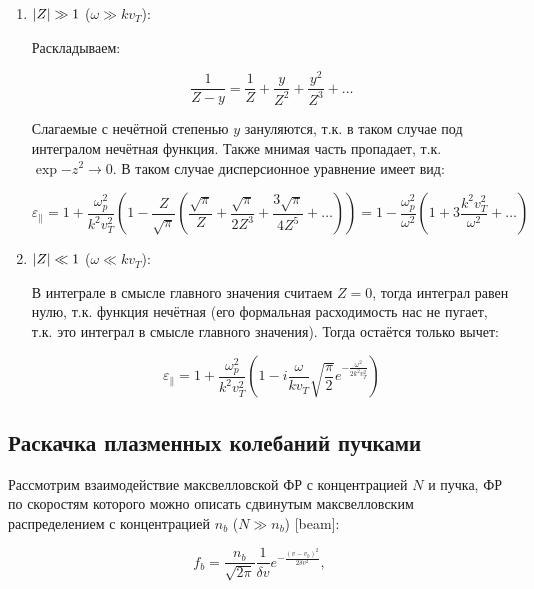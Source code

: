 \documentclass[10pt, a4paper]{article}
\begin{document}
\begin{enumerate}
	
	\item $\abs{Z} \gg 1$ ($\omega \gg kv_T$):
	
	Раскладываем:
	
	\begin{equation*}
		\frac{1}{Z-y} = \frac{1}{Z} + \frac{y}{Z^2} + \frac{y^2}{Z^3} + \ldots
	\end{equation*}
	
	Слагаемые с нечётной степенью $y$ зануляются, т.к. в таком случае под интегралом нечётная функция. Также мнимая часть пропадает, т.к. $\exp{-z^2}\rightarrow 0$. В таком случае дисперсионное уравнение имеет вид:
	
	\begin{equation} \label{eq:Landau_damp_Maxw_big_omega}
		\varepsilon_\parallel = 1 + \frac{\omega_p^2}{k^2 v_T^2} \left( 1 - \frac{Z}{\sqrt{\pi}}\left( \frac{\sqrt{\pi}}{Z} + \frac{\sqrt{\pi}}{2Z^3} + \frac{3\sqrt{\pi}}{4Z^5} + \ldots \right) \right)	= 1 - \frac{\omega_p^2}{\omega^2}\left( 1 + 3\frac{k^2 v_T^2}{\omega^2} + \ldots \right)
	\end{equation}	
	
	\item $\abs{Z} \ll 1$ ($\omega \ll kv_T$):
	
	В интеграле в смысле главного значения считаем $Z = 0$, тогда интеграл равен нулю, т.к. функция нечётная (его формальная расходимость нас не пугает, т.к. это интеграл в смысле главного значения). Тогда остаётся только вычет:
	
	\begin{equation} \label{eq:Landau_damp_Maxw_small_omega}
		\varepsilon_\parallel = 1 + \frac{\omega_p^2}{k^2 v_T^2} \left(1 - i \frac{\omega}{kv_T}\sqrt{\frac{\pi}{2}}e^{-\frac{\omega^2}{2k^2v_T^2}} \right)
	\end{equation}
	
\end{enumerate}

\subsection{Раскачка плазменных колебаний пучками}

Рассмотрим взаимодействие максвелловской ФР с концентрацией $N$ и пучка, ФР по скоростям которого можно описать сдвинутым максвелловским распределением с концентрацией $n_b$ ($N\gg n_b$) [beam]:

\begin{equation*}
	f_b = \frac{n_b}{\sqrt{2\pi}}\frac{1}{\delta v}e^{-\frac{(v-v_b)^2}{2\delta v^2}},
\end{equation*}
\end{document}
